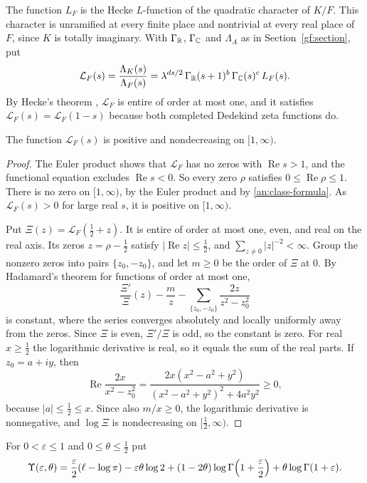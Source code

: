 The function $L_F$ is the Hecke $L$-function of the quadratic character of
$K/F$. This character is unramified at every finite place and nontrivial at
every real place of $F$, since $K$ is totally imaginary. With $\Gamma_\mathbb R$,
$\Gamma_\mathbb C$ and $\Lambda_A$ as in Section~\ref{gf:section}, put
\begin{equation}\label{an:completion}
 \mathcal L_F(s)=\frac{\Lambda_K(s)}{\Lambda_F(s)}
 =\lambda^{ds/2}\,\Gamma_\mathbb R(s+1)^b\,\Gamma_\mathbb C(s)^c\,L_F(s).
\end{equation}
By Hecke's theorem \cite{Hecke1920,Tate1967}, $\mathcal L_F$ is entire of
order at most one, and it satisfies $\mathcal L_F(s)=\mathcal L_F(1-s)$
because both completed Dedekind zeta functions do.

\begin{lemma}\label{an:monotonicity}
The function $\mathcal L_F(s)$ is positive and nondecreasing on $[1,\infty)$.
\end{lemma}

\begin{proof}
The Euler product shows that $\mathcal L_F$ has no zeros with
$\operatorname{Re}s>1$, and the functional equation excludes
$\operatorname{Re}s<0$. So every zero $\rho$ satisfies $0\le\operatorname{Re}
\rho\le1$. There is no zero on $[1,\infty)$, by the Euler product and by
\eqref{an:class-formula}. As $\mathcal L_F(s)>0$ for large real $s$,
it is positive on $[1,\infty)$.

Put $\Xi(z)=\mathcal L_F(\frac12+z)$. It is entire of order at most one,
even, and real on the real axis. Its zeros $z=\rho-\frac12$ satisfy
$|\operatorname{Re}z|\le\frac12$, and $\sum_{z\ne0}|z|^{-2}<\infty$. Group
the nonzero zeros into pairs $\{z_0,-z_0\}$, and let $m\ge0$ be the order of
$\Xi$ at $0$. By Hadamard's theorem for functions of order at most one,
\[
 \frac{\Xi'}{\Xi}(z)-\frac mz-\sum_{\{z_0,-z_0\}}\frac{2z}{z^2-z_0^2}
\]
is constant, where the series converges absolutely and locally uniformly
away from the zeros. Since $\Xi$ is even, $\Xi'/\Xi$ is odd, so the constant
is zero. For real $x\ge\frac12$ the logarithmic derivative is real, so it
equals the sum of the real parts. If $z_0=a+iy$, then
\[
 \operatorname{Re}\frac{2x}{x^2-z_0^2}
 =\frac{2x(x^2-a^2+y^2)}{(x^2-a^2+y^2)^2+4a^2y^2}\ge0,
\]
because $|a|\le\frac12\le x$. Since also $m/x\ge0$, the logarithmic
derivative is nonnegative, and $\log\Xi$ is nondecreasing on
$[\frac12,\infty)$.
\end{proof}

For $0<\varepsilon\le1$ and $0\le\theta\le\frac12$ put
\begin{equation}\label{an:gamma}
 \Upsilon(\varepsilon,\theta)
 =\frac\varepsilon2(\ell-\log\pi)-\varepsilon\theta\log2
 +(1-2\theta)\log\Gamma\Bigl(1+\frac\varepsilon2\Bigr)
 +\theta\log\Gamma(1+\varepsilon).
\end{equation}

